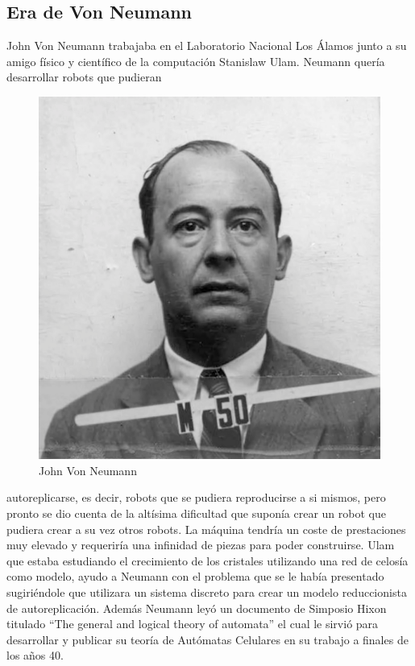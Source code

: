 \subsection{Era de Von Neumann} %
John Von Neumann trabajaba en el Laboratorio Nacional Los Álamos junto a su amigo físico y científico de la computación Stanislaw Ulam. Neumann quería desarrollar robots que pudieran 
\begin{figure}
\centering
\includegraphics[scale=3]{imagenes/neumann.png}
\caption{John Von Neumann}
\label{fig:neumann}
\end{figure}
autoreplicarse, es decir, robots que se pudiera reproducirse a si mismos, pero pronto se dio cuenta de la altísima dificultad que suponía crear un robot que pudiera crear a su vez otros robots. La máquina tendría un coste de prestaciones muy elevado y requeriría una infinidad de piezas para poder construirse. Ulam que estaba estudiando el crecimiento de los cristales utilizando una red de celosía como modelo, ayudo a Neumann con el problema que se le había presentado sugiriéndole que utilizara un sistema discreto para crear un modelo reduccionista de autoreplicación. Además Neumann leyó un documento de Simposio Hixon titulado ``The general and logical theory of automata'' el cual le sirvió para desarrollar y publicar su teoría de Autómatas Celulares en su trabajo \cite{Teoria_Von_neumann} a finales de los años 40. \\


